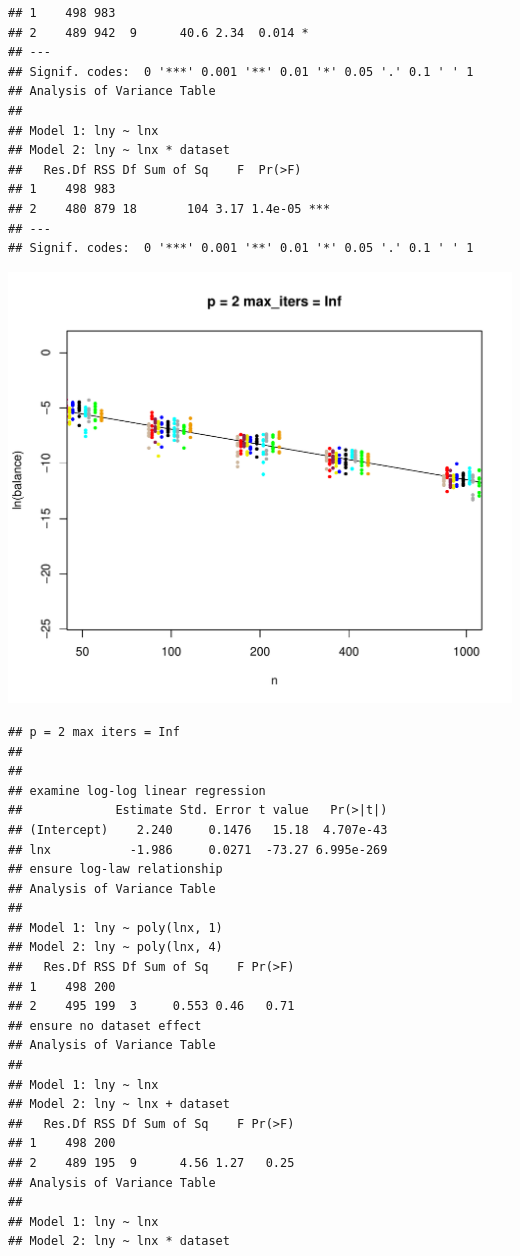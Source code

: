 \documentclass{article}\usepackage[]{graphicx}\usepackage[]{color}
\makeatletter
\def\maxwidth{ %
  \ifdim\Gin@nat@width>\linewidth
    \linewidth
  \else
    \Gin@nat@width
  \fi
}
\newenvironment{kframe}{%
 \def\at@end@of@kframe{}%
 \ifinner\ifhmode%
  \def\at@end@of@kframe{\end{minipage}}%
  \begin{minipage}{\columnwidth}%
 \fi\fi%
 \def\FrameCommand##1{\hskip\@totalleftmargin \hskip-\fboxsep
 \colorbox{shadecolor}{##1}\hskip-\fboxsep
     \hskip-\linewidth \hskip-\@totalleftmargin \hskip\columnwidth}%
 \MakeFramed {\advance\hsize-\width
   \@totalleftmargin\z@ \linewidth\hsize
   \@setminipage}}%
 {\par\unskip\endMakeFramed%
 \at@end@of@kframe}
\newenvironment{knitrout}{}{} %
\makeatother
\begin{document}
\begin{knitrout}
\begin{kframe}
\begin{verbatim}
## 1    498 983                           
## 2    489 942  9      40.6 2.34  0.014 *
## ---
## Signif. codes:  0 '***' 0.001 '**' 0.01 '*' 0.05 '.' 0.1 ' ' 1
## Analysis of Variance Table
## 
## Model 1: lny ~ lnx
## Model 2: lny ~ lnx * dataset
##   Res.Df RSS Df Sum of Sq    F  Pr(>F)    
## 1    498 983                              
## 2    480 879 18       104 3.17 1.4e-05 ***
## ---
## Signif. codes:  0 '***' 0.001 '**' 0.01 '*' 0.05 '.' 0.1 ' ' 1
\end{verbatim}
\end{kframe}
\includegraphics[width=\maxwidth]{figure/load_and_cleanup_data2} 
\begin{kframe}\begin{verbatim}
## p = 2 max iters = Inf 
## 
## 
## examine log-log linear regression
##             Estimate Std. Error t value   Pr(>|t|)
## (Intercept)    2.240     0.1476   15.18  4.707e-43
## lnx           -1.986     0.0271  -73.27 6.995e-269
## ensure log-law relationship
## Analysis of Variance Table
## 
## Model 1: lny ~ poly(lnx, 1)
## Model 2: lny ~ poly(lnx, 4)
##   Res.Df RSS Df Sum of Sq    F Pr(>F)
## 1    498 200                         
## 2    495 199  3     0.553 0.46   0.71
## ensure no dataset effect
## Analysis of Variance Table
## 
## Model 1: lny ~ lnx
## Model 2: lny ~ lnx + dataset
##   Res.Df RSS Df Sum of Sq    F Pr(>F)
## 1    498 200                         
## 2    489 195  9      4.56 1.27   0.25
## Analysis of Variance Table
## 
## Model 1: lny ~ lnx
## Model 2: lny ~ lnx * dataset

\end{verbatim}
\end{kframe}
\end{knitrout}
\end{document}

